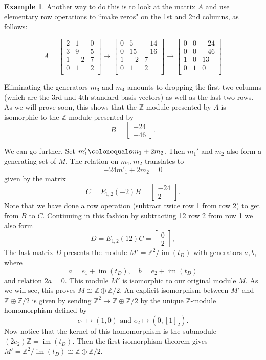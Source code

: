 \documentclass[12pt]{report}
\numberwithin{equation}{section}
\numberwithin{theorem}{chapter}
\theoremstyle{definition}
\newtheorem{example}[theorem]{Example}
\newtheorem*{basic properties}{Basic Properties}
\newtheorem*{Important Remark}{Important Remark}
\newcommand{\Z}{\mathbb{Z}}
\DeclareMathOperator{\im}{im}
\begin{document}
\begin{example}
Another way to do this is to look at the matrix $A$ and use elementary row operations to ``make zeros" on the 1st and 2nd columns, as follows:

$$
A =
\begin{bmatrix}
2 & 1 & 0 \\
3 & 9 & 5 \\
1 & -2 & 7 \\
0 & 1 & 2 \\
\end{bmatrix}
\rightarrow
\begin{bmatrix}
0 & 5 & -14 \\
0 & 15 & -16 \\
1 & -2 & 7 \\
0 & 1 & 2 \\
\end{bmatrix}
\rightarrow
\begin{bmatrix}
0 & 0 & -24 \\
0 & 0 & -46 \\
1 & 0 & 13\\
0 & 1 & 0 \\
\end{bmatrix}
$$

Eliminating the generators $m_3$ and $m_4$ amounts to dropping the first two columns (which are the 3rd and 4th standard basis vectors) as well as the last two rows. As we will prove soon, this shows that the $\Z$-module presented by $A$ is  isomorphic to the $\Z$-module presented by
$$
B=
\begin{bmatrix} -24 \\ - 46
\end{bmatrix}.
$$



We can go further. Set $m_1' \colonequals m_1 + 2m_2$. Then $m_1'$ and $m_2$ also form a generating set of $M$. The relation on $m_1, m_2$ translates to
$$
-24m'_1  +2 m_2 = 0
$$
given by the matrix
$$
C = E_{1,2}(-2)B=
\begin{bmatrix} -24 \\ 2
\end{bmatrix}.
$$
Note that we have done a row operation (subtract twice row 1 from row 2) to get from $B$ to $C$.
Continuing in this fashion by subtracting 12 row 2 from row 1 we also form 
$$
D = E_{1,2}(12)C=
\begin{bmatrix} 0 \\ 2
\end{bmatrix},
$$
The last matrix $D$ presents the module $M'=\Z^2/\im(t_D)$ with generators $a, b$, where
$$a=e_1+\im(t_D), \quad b=e_2+\im(t_D)$$ 
and relation $2a = 0$. This module $M'$ is isomorphic to our original module $M$. As we will see, this proves $M \cong \Z \oplus \Z/2$. An explicit isomorphism between $M'$ and $\Z \oplus \Z/2$ is given by sending $\Z^2\to \Z \oplus \Z/2$ by the unique $\Z$-module homomorphism defined by 
$$e_1\mapsto (1,0) \textrm{ and } e_2\mapsto (0,[1]_2).$$ 
Now notice that the kernel of this homomorphism is the submodule $(2e_2)\Z=\im(t_D)$. Then the first isomorphism theorem gives
$M'=\Z^2/\im(t_D)\cong \Z \oplus \Z/2$.
\end{example}
\end{document}

